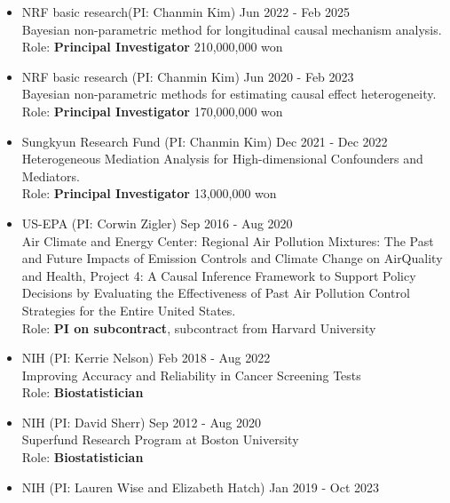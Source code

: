 \documentclass[10pt]{article}
\newenvironment{innerlist}[1][\enskip\textbullet]%
        {\begin{itemize}[#1,leftmargin=*,parsep=0pt,itemsep=0pt,topsep=0pt,partopsep=0pt]}
        {\end{itemize}}
\begin{document}
\begin{innerlist}
\item[] NRF basic research(PI: Chanmin Kim) \quad\qquad\qquad \hfill{Jun 2022 - Feb 2025}\\
 Bayesian non-parametric method for longitudinal causal mechanism analysis.\\ 
Role: {\bf Principal Investigator} \hfill {210,000,000 won}\\
\item[] NRF basic research (PI: Chanmin Kim) \quad\qquad\qquad \hfill{Jun 2020 - Feb 2023}\\
 Bayesian non-parametric methods for estimating causal effect heterogeneity.\\ 
Role: {\bf Principal Investigator} \hfill {170,000,000 won}\\
\item[] Sungkyun Research Fund (PI: Chanmin Kim) \quad\qquad\qquad \hfill{Dec 2021 - Dec 2022}\\
 Heterogeneous Mediation Analysis for High-dimensional Confounders and
Mediators.\\ 
Role: {\bf Principal Investigator} \hfill{13,000,000 won}\\
\item[] US-EPA (PI: Corwin Zigler) \quad\qquad\qquad \hfill{Sep 2016 - Aug 2020}\\
 Air Climate and Energy Center:  Regional Air Pollution Mixtures:  The Past and Future Impacts of Emission Controls and Climate Change on AirQuality and Health, Project 4: A Causal Inference Framework to Support Policy Decisions by Evaluating the Effectiveness of Past Air Pollution Control Strategies for the Entire United States.\\ 
Role: {\bf PI on subcontract}, subcontract from Harvard University\\
\item[] NIH (PI: Kerrie Nelson) \quad\qquad\qquad \hfill{Feb 2018 - Aug 2022}\\
Improving Accuracy and Reliability in Cancer Screening Tests\\
Role: {\bf Biostatistician}\\
\item[] NIH (PI: David Sherr) \quad\qquad\qquad \hfill{Sep 2012 - Aug 2020}\\
Superfund Research Program at Boston University\\
Role: {\bf Biostatistician}\\
\item[] NIH (PI: Lauren Wise and Elizabeth Hatch) \quad\qquad\qquad \hfill{Jan 2019 - Oct 2023}\\

\end{innerlist}
\end{document}
